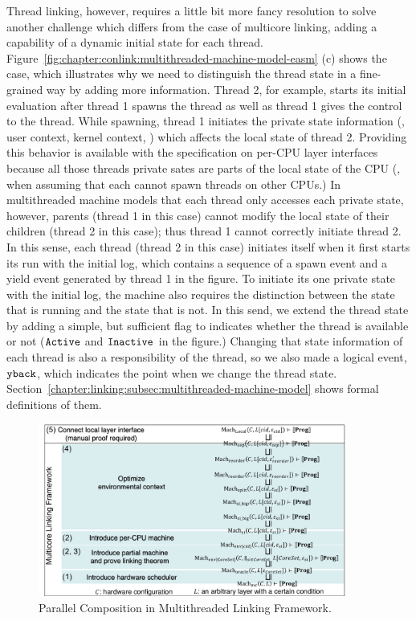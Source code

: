 Thread linking, however, requires a little bit more fancy resolution to solve another challenge which differs from the case of multicore linking, adding a capability of a dynamic initial state for each thread.
Figure~\ref{fig:chapter:conlink:multithreaded-machine-model-easm} (c) 
shows the case, which illustrates why we need to distinguish the thread state in a fine-grained way by adding more information. 
Thread 2, for example, starts its initial evaluation after thread 1 spawns the thread as well as thread 1 gives the control to the thread. 
While spawning, thread 1 initiates the private state information (\eg, user context, kernel context, \etc) which affects the local state of thread 2. 
Providing this behavior is available with the specification on per-CPU layer interfaces because all those threads private sates are parts of the local state of the CPU (\ie, when assuming that each cannot spawn threads on other CPUs.)
In multithreaded machine models that each thread only accesses each private state, however, 
parents (thread 1 in this case) cannot modify the local state of their children (thread 2 in this case); thus thread 1 cannot correctly initiate thread 2.
In this sense,
each thread (thread 2 in this case) initiates itself when it first starts its run with the initial log,
which contains a sequence of a spawn event and a yield event generated by thread 1 in the figure. 
To initiate its one private state with the initial log, 
the machine also requires the distinction between the state that is running and the state that is not.
In this send, we extend the thread state by adding a simple, but sufficient flag to indicates whether the thread is available or not (${\mathrm{\texttt{Active}}}$ and ${\mathrm{\texttt{Inactive}}}$ in the figure.)
Changing that state information of each thread is also a responsibility of the thread,
so we also made a logical event, ${\mathrm{\texttt{yback}}}$, which indicates the point when we change the thread state.
Section~\ref{chapter:linking:subsec:multithreaded-machine-model} shows formal definitions of them. 

\begin{figure}
\begin{center}
\includegraphics[width=0.9\textwidth, page=6]{figs/conlink/concurrent_linking}
\end{center}
\caption{Parallel Composition in Multithreaded Linking Framework.}
\label{fig:chapter:conlink:parallel-composition-in-easm}
\end{figure}

